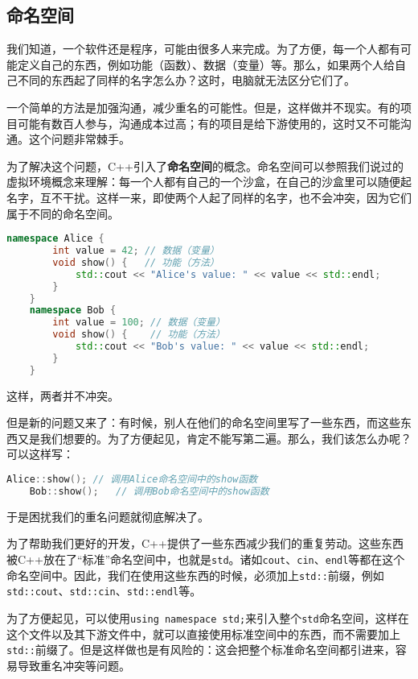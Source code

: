 \subsection{命名空间}

我们知道，一个软件还是程序，可能由很多人来完成。为了方便，每一个人都有可能定义自己的东西，例如功能（函数）、数据（变量）等。那么，如果两个人给自己不同的东西起了同样的名字怎么办？这时，电脑就无法区分它们了。

一个简单的方法是加强沟通，减少重名的可能性。但是，这样做并不现实。有的项目可能有数百人参与，沟通成本过高；有的项目是给下游使用的，这时又不可能沟通。这个问题非常棘手。

为了解决这个问题，C++引入了\textbf{命名空间}的概念。命名空间可以参照我们说过的虚拟环境概念来理解：每一个人都有自己的一个沙盒，在自己的沙盒里可以随便起名字，互不干扰。这样一来，即使两个人起了同样的名字，也不会冲突，因为它们属于不同的命名空间。
\begin{lstlisting}[language=C++]
    namespace Alice {
        int value = 42; // 数据（变量）
        void show() {   // 功能（方法）
            std::cout << "Alice's value: " << value << std::endl;
        }
    }
    namespace Bob {
        int value = 100; // 数据（变量）
        void show() {    // 功能（方法）
            std::cout << "Bob's value: " << value << std::endl;
        }
    }
\end{lstlisting}
这样，两者并不冲突。

但是新的问题又来了：有时候，别人在他们的命名空间里写了一些东西，而这些东西又是我们想要的。为了方便起见，肯定不能写第二遍。那么，我们该怎么办呢？可以这样写：
\begin{lstlisting}[language=C++]
    Alice::show(); // 调用Alice命名空间中的show函数
    Bob::show();   // 调用Bob命名空间中的show函数   
\end{lstlisting}
于是困扰我们的重名问题就彻底解决了。

为了帮助我们更好的开发，C++提供了一些东西减少我们的重复劳动。这些东西被C++放在了“标准”命名空间中，也就是\texttt{std}。诸如\texttt{cout}、\texttt{cin}、\texttt{endl}等都在这个命名空间中。因此，我们在使用这些东西的时候，必须加上\texttt{std::}前缀，例如\texttt{std::cout}、\texttt{std::cin}、\texttt{std::endl}等。

为了方便起见，可以使用\texttt{using namespace std;}来引入整个\texttt{std}命名空间，这样在这个文件以及其下游文件中，就可以直接使用标准空间中的东西，而不需要加上\texttt{std::}前缀了。但是这样做也是有风险的：这会把整个标准命名空间都引进来，容易导致重名冲突等问题。

